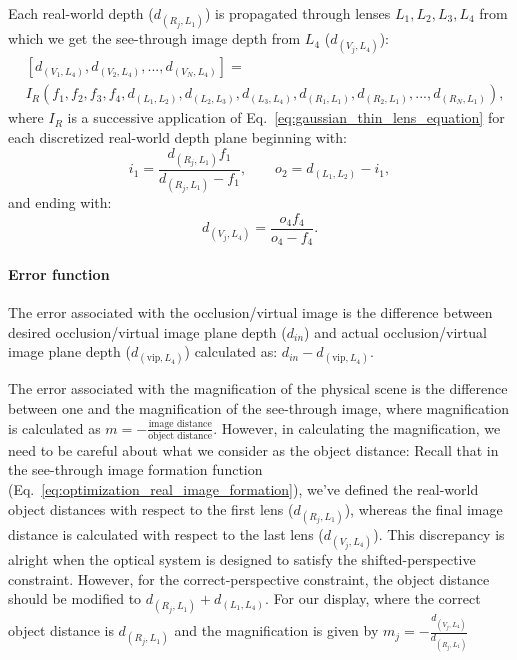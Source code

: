 Each real-world depth ($d_{(R_j,L_1)}$) is propagated through lenses $L_1,L_2,L_3,L_4$ from which we get the see-through image depth from $L_4$ ($d_{(V_j,L_4)}$):
\begin{align}
&[d_{(V_1,L_4)}, d_{(V_2,L_4)},...,d_{(V_N,L_4)}] = \nonumber\\
&I_R(f_1, f_2, f_3, f_4, d_{(L_1,L_2)}, d_{(L_2,L_3)}, d_{(L_3,L_4)}, d_{(R_1,L_1)},d_{(R_2,L_1)},...,d_{(R_N,L_1)}),
\label{eq:optimization_real_image_formation}
\end{align}
where $I_R$ is a successive application of Eq.~\eqref{eq:gaussian_thin_lens_equation} for each discretized real-world depth plane beginning with:
\begin{equation}
i_1 = \frac{d_{(R_j,L_1)} f_1}{d_{(R_j,L_1)}-f_1},
\quad \quad
o_{2} = d_{(L_1,L_2)} - i_1,
\end{equation}
and ending with:
\begin{equation}
d_{(V_j,L_4)} = \frac{o_4 f_4}{o_4 - f_4}.
\end{equation}

\paragraph{\textbf{Error function}}
The error associated with the occlusion/virtual image is the difference between desired occlusion/virtual image plane depth ($d_{in}$) and actual occlusion/virtual image plane depth ($d_{(\text{vip},L_4)}$) calculated as: $d_{in} - d_{(\text{vip},L_4)}$.

The error associated with the magnification of the physical scene is the difference between one and the magnification of the see-through image, where magnification is calculated as $m = -\frac{\text{image distance}}{\text{object distance}}$. However, in calculating the magnification, we need to be careful about what we consider as the object distance: Recall that in the see-through image formation function (Eq.~\eqref{eq:optimization_real_image_formation}), we've defined the real-world object distances with respect to the first lens ($d_{(R_j, L_1)}$), whereas the final image distance is calculated with respect to the last lens ($d_{(V_j, L_4)}$). This discrepancy is alright when the optical system is designed to satisfy the shifted-perspective constraint. However, for the correct-perspective constraint, the object distance should be modified to $d_{(R_j,L_1)}+d_{(L_1,L_4)}$. For our display, where the correct object distance is $d_{(R_j,L_1)}$ and the magnification is given by $m_j=-\frac{d_{(V_j,L_4)}}{d_{(R_j,L_1)}}$

